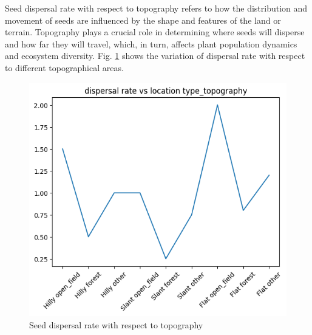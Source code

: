\documentclass[conference]{IEEEtran}
\begin{document}
Seed dispersal rate with respect to topography refers to how the distribution and movement of seeds are influenced by the shape and features of the land or terrain. Topography plays a crucial role in determining where seeds will disperse and how far they will travel, which, in turn, affects plant population dynamics and ecosystem diversity. Fig. \ref{ds} shows the variation of dispersal rate with respect to different topographical areas.
\begin{figure}[htp]
    \centering
    \includegraphics[scale=0.4]{download (1).png}
    \caption{Seed dispersal rate with respect to topography}
    \label{ds}
\end{figure}
\end{document}
